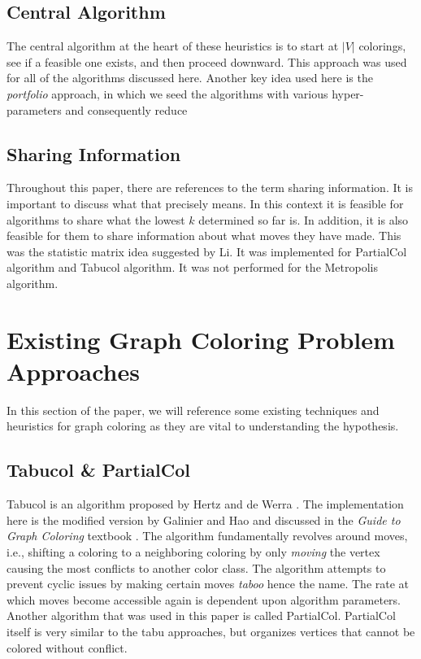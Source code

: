 \documentclass[runningheads]{llncs}
\begin{document}
\subsection{Central Algorithm}

The central algorithm at the heart of these heuristics is to start at $|V|$ colorings, see if a feasible one exists, and then proceed downward. This approach was used for all of the algorithms discussed here. Another key idea used here is the \emph{portfolio} approach, in which we seed the algorithms with various hyper-parameters and consequently reduce

\subsection{Sharing Information}
Throughout this paper, there are references to the term sharing information. It is important to discuss what that precisely means. In this context it is feasible for algorithms to share what the lowest $k$ determined so far is. In addition, it is also feasible for them to share information about what moves they have made. This was the statistic matrix idea suggested by Li. \cite{https://doi.org/10.5445/ir/1000083192} It was implemented for PartialCol algorithm and Tabucol algorithm. It was not performed for the Metropolis algorithm. 

\section{Existing Graph Coloring Problem Approaches }

In this section of the paper, we will reference some existing techniques and heuristics for graph coloring as they are vital to understanding the hypothesis.

\subsection{Tabucol \& PartialCol}\label{AA}
Tabucol is an algorithm proposed by Hertz and de Werra \cite{hdw}. The implementation here is the modified version by Galinier and Hao \cite{TabuCol} and discussed in the \emph{Guide to Graph Coloring} textbook \cite{10.5555/2851123}. The algorithm fundamentally revolves around moves, i.e., shifting a coloring to a neighboring coloring by only \emph{moving} the vertex causing the most conflicts to another color class. The algorithm attempts to prevent cyclic issues by making certain moves \emph{taboo} hence the name. The rate at which moves become accessible again is dependent upon algorithm parameters. Another algorithm that was used in this paper is called PartialCol. PartialCol itself is very similar to the tabu approaches, but organizes vertices that cannot be colored without conflict.
\end{document}
